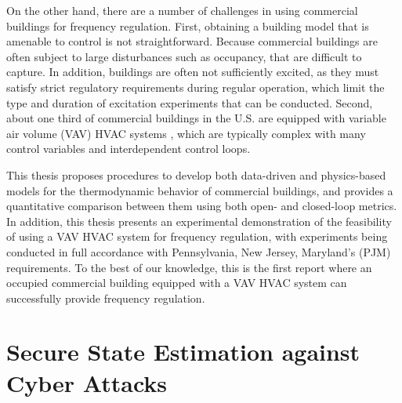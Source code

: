 \documentclass[../thesis.tex]{subfiles}
\begin{document}
On the other hand, there are a number of challenges in using commercial buildings for frequency regulation. 
First, obtaining a building model that is amenable to control is not straightforward. 
Because commercial buildings are often subject to large disturbances such as occupancy, that are difficult to capture. 
In addition, buildings are often not sufficiently excited, as they must satisfy strict regulatory requirements during regular operation, which limit the type and duration of excitation experiments that can be conducted.
Second, about one third of commercial buildings in the U.S. are equipped with variable air volume (VAV) HVAC systems \cite{Hao:2012demandresponse}, which are typically complex with many control variables and interdependent control loops.

This thesis proposes procedures to develop both data-driven and physics-based models for the thermodynamic behavior of commercial buildings, and provides a quantitative comparison between them using both open- and closed-loop metrics. 
In addition, this thesis presents an experimental demonstration of the feasibility of using a VAV HVAC system for frequency regulation, with experiments being conducted in full accordance with Pennsylvania, New Jersey, Maryland's (PJM) requirements. %
To the best of our knowledge, this is the first report where an occupied commercial building equipped with a VAV HVAC system can successfully provide frequency regulation.






\section{Secure State Estimation against Cyber Attacks}
\end{document}
